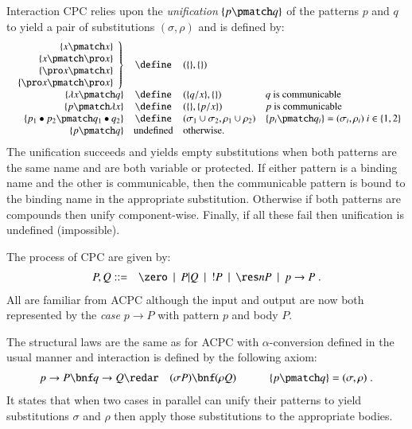 \documentclass[submission,copyright,creativecommons]{eptcs}
\def\BNF{\ \  | \ \  }
\renewcommand{\iap}[1]{#1\to}
\begin{document}
Interaction CPC relies upon the {\em unification} $\cpcmatch p q$ of the patterns $p$ and $q$
to yield a pair of substitutions $(\sigma,\rho)$ and is 
defined by:
\begin{equation*}
\begin{array}{rcll}
\left.
\begin{array}{r}
\cpcmatch x x \\
\cpcmatch x {\pro x} \\
\cpcmatch {\pro x} x \\
\cpcmatch {\pro x} {\pro x}
\end{array}
\right\}
&\define& (\{\},\{\})\\
\cpcmatch {\lambda x} q &\define& (\{q/x\},\{\}) &q\mbox{\ is communicable}\\
\cpcmatch p {\lambda x} &\define& (\{\},\{p/x\}) &p\mbox{\ is communicable}\\
\cpcmatch {p_1\bullet p_2} {q_1\bullet q_2} &\define& (\sigma_1\cup\sigma_2,\rho_1\cup\rho_2)
& \cpcmatch {p_i} {q_i} = (\sigma_i,\rho_i)\ i\in\{1,2\}\\
\cpcmatch p q &\mbox{undefined}& \mbox{otherwise.}
\end{array}
\end{equation*}
The unification succeeds and yields empty substitutions when both patterns are the same
name and are both variable or protected.
If either pattern is a binding name and the other is communicable, then the communicable
pattern is bound to the binding name in the appropriate substitution.
Otherwise if both patterns are compounds then unify component-wise.
Finally, if all these fail then unification is undefined (impossible).

The process of CPC are given by:
\begin{eqnarray*}
P,Q &::=& \zero\BNF P|Q\BNF !P\BNF \res n P\BNF \iap p P\; .
\end{eqnarray*}
All are familiar from ACPC although the input and output are now both represented by
the {\em case} $\iap p P$ with pattern $p$ and body $P$.

The structural laws are the same as for ACPC with $\alpha$-conversion defined in the usual
manner \cite{GivenWilsonGorlaJay10,givenwilson:hal-00987578} and interaction is defined by the following
axiom:
\begin{eqnarray*}
\iap p P\bnf \iap q Q &\redar& (\sigma P)\bnf (\rho Q) \quad\quad\quad \cpcmatch p q = (\sigma,\rho)\; .
\end{eqnarray*}
It states that when two cases in parallel can unify their patterns to yield substitutions
$\sigma$ and $\rho$ then apply those substitutions to the appropriate bodies.
\end{document}
